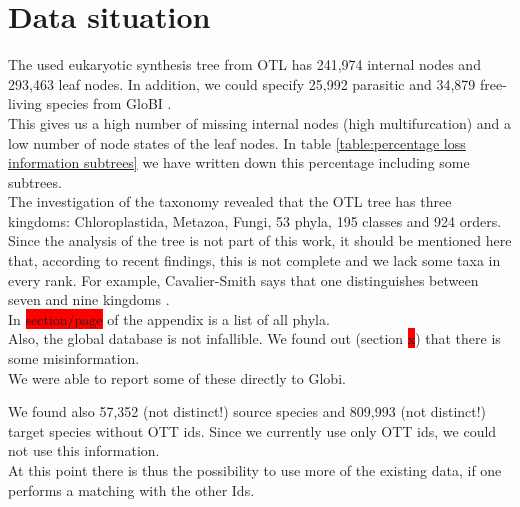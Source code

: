 
  \section{Data situation} \label{sec:discussion - data situation}
    The used eukaryotic synthesis tree from OTL \cite{Hinchliff2015} has 241,974 internal nodes and 
      293,463 leaf nodes. In addition, we could specify 25,992 parasitic and 34,879 free-living 
      species from GloBI \cite{Poelen2014}. \\
    This gives us a high number of missing internal nodes (high multifurcation) and a low number of 
      node states of the leaf nodes. In table \ref{table:percentage loss information subtrees} we have 
      written down this percentage including some subtrees. \\

    The investigation of the taxonomy revealed that the OTL tree has three kingdoms: Chloroplastida, 
      Metazoa, Fungi, 53 phyla, 195 classes and 924 orders. \\
    Since the analysis of the tree is not part of this work, it should be mentioned here that, 
      according to recent findings, this is not complete and we lack some taxa in every rank. For 
      example, Cavalier-Smith says that one distinguishes between seven and nine kingdoms 
      \cite{CavalierSmith1981}. \\
    In \colorbox{red}{section/page} \pageref{subsec:listPhyla} of the appendix is a list of all phyla. \\

    Also, the global database is not infallible. We found out (section \colorbox{red}{x}) that there is some 
      misinformation. \\
    We were able to report some of these directly to Globi.

    We found also 57,352 (not distinct!) source species and 809,993 (not distinct!) target species 
      without OTT ids. Since we currently use only OTT ids, we could not use this information. \\
    At this point there is thus the possibility to use more of the existing data, if one performs a 
      matching with the other Ids.


